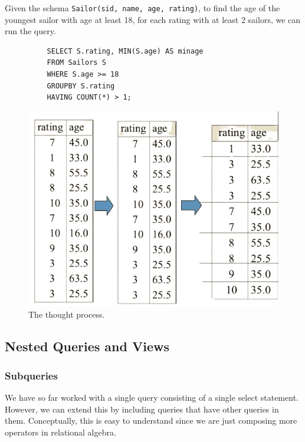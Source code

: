 \documentclass{article}
\begin{document}
      \begin{example}
        Given the schema \texttt{Sailor(sid, name, age, rating)}, to find the age of the youngest sailor with age at least 18, for each rating with at least 2 sailors, we can run the query. 
        \begin{lstlisting}
          SELECT S.rating, MIN(S.age) AS minage 
          FROM Sailors S 
          WHERE S.age >= 18
          GROUPBY S.rating 
          HAVING COUNT(*) > 1; 
        \end{lstlisting}

        \begin{figure}[H]
          \centering 
          \includegraphics[scale=0.4]{img/sailors.png}
          \caption{The thought process.} 
          \label{fig:thought}
        \end{figure}
      \end{example}

  \subsection{Nested Queries and Views} 

    \subsubsection{Subqueries}

      We have so far worked with a single query consisting of a single select statement. However, we can extend this by including queries that have other queries in them. Conceptually, this is easy to understand since we are just composing more operators in relational algebra. 
\end{document}
